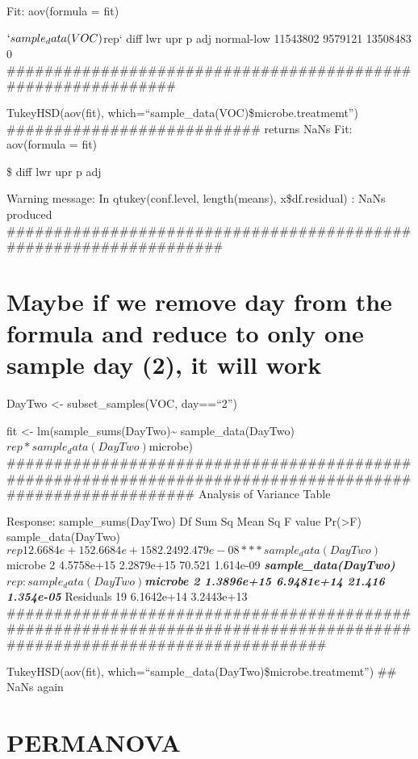 \documentclass[]{article}
\begin{document}
Fit: aov(formula = fit)

\(`sample_data(VOC)\)rep` diff lwr upr p adj normal-low 11543802 9579121
13508483 0
\#\#\#\#\#\#\#\#\#\#\#\#\#\#\#\#\#\#\#\#\#\#\#\#\#\#\#\#\#\#\#\#\#\#\#\#\#\#\#\#\#\#\#\#\#\#\#\#\#\#\#\#\#\#\#\#\#\#\#\#\#

TukeyHSD(aov(fit), which=``sample\_data(VOC)\$microbe.treatmemt'')
\#\#\#\#\#\#\#\#\#\#\#\#\#\#\#\#\#\#\#\#\#\#\#\#\#\#\# returns NaNs Fit:
aov(formula = fit)

\$ diff lwr upr p adj

Warning message: In qtukey(conf.level, length(means), x\$df.residual) :
NaNs produced
\#\#\#\#\#\#\#\#\#\#\#\#\#\#\#\#\#\#\#\#\#\#\#\#\#\#\#\#\#\#\#\#\#\#\#\#\#\#\#\#\#\#\#\#\#\#\#\#\#\#\#\#\#\#\#\#\#\#\#\#\#\#\#\#\#\#

\section{Maybe if we remove day from the formula and reduce to only one
sample day (2), it will
work}\label{maybe-if-we-remove-day-from-the-formula-and-reduce-to-only-one-sample-day-2-it-will-work}

DayTwo \textless{}- subset\_samples(VOC, day==``2'')

fit \textless{}- lm(sample\_sums(DayTwo)\textasciitilde{}
sample\_data(DayTwo)\(rep * sample_data(DayTwo)\)microbe)
\#\#\#\#\#\#\#\#\#\#\#\#\#\#\#\#\#\#\#\#\#\#\#\#\#\#\#\#\#\#\#\#\#\#\#\#\#\#\#\#\#\#\#\#\#\#\#\#\#\#\#\#\#\#\#\#\#\#\#\#\#\#\#\#\#\#\#\#\#\#\#\#\#\#\#\#\#\#\#\#\#\#\#\#\#\#\#\#\#\#\#\#\#\#\#\#\#\#\#\#\#\#\#\#\#\#
Analysis of Variance Table

Response: sample\_sums(DayTwo) Df Sum Sq Mean Sq F value
Pr(\textgreater{}F)\\
sample\_data(DayTwo)\(rep 1 2.6684e+15 2.6684e+15 82.249 2.479e-08 *** sample_data(DayTwo)\)microbe
2 4.5758e+15 2.2879e+15 70.521 1.614e-09 \textbf{\emph{
sample\_data(DayTwo)\(rep:sample_data(DayTwo)\)microbe 2 1.3896e+15
6.9481e+14 21.416 1.354e-05 }} Residuals 19 6.1642e+14 3.2443e+13\\
\#\#\#\#\#\#\#\#\#\#\#\#\#\#\#\#\#\#\#\#\#\#\#\#\#\#\#\#\#\#\#\#\#\#\#\#\#\#\#\#\#\#\#\#\#\#\#\#\#\#\#\#\#\#\#\#\#\#\#\#\#\#\#\#\#\#\#\#\#\#\#\#\#\#\#\#\#\#\#\#\#\#\#\#\#\#\#\#\#\#\#\#\#\#\#\#\#\#\#\#\#\#\#\#\#\#\#\#\#\#\#\#\#\#\#\#\#\#\#\#

TukeyHSD(aov(fit), which=``sample\_data(DayTwo)\$microbe.treatmemt'')
\#\# NaNs again

\section{PERMANOVA}\label{permanova}
\end{document}
